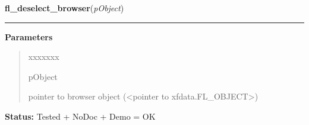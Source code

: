     \label{xformslib:library:fl_deselect_browser}

    \vspace{0.5ex}

\hspace{.8\funcindent}\begin{boxedminipage}{\funcwidth}

    \raggedright \textbf{fl\_deselect\_browser}(\textit{pObject})

    \vspace{-1.5ex}

    \rule{\textwidth}{0.5\fboxrule}
\setlength{\parskip}{2ex}
\setlength{\parskip}{1ex}
      \textbf{Parameters}
      \vspace{-1ex}

      \begin{quote}
        \begin{Ventry}{xxxxxxx}

          \item[pObject]

          pointer to browser object ({\textless}pointer to 
          xfdata.FL\_OBJECT{\textgreater})

        \end{Ventry}

      \end{quote}

\textbf{Status:} Tested + NoDoc + Demo = OK



    \end{boxedminipage}

    \label{xformslib:library:fl_isselected_browser_line}

    \vspace{0.5ex}

